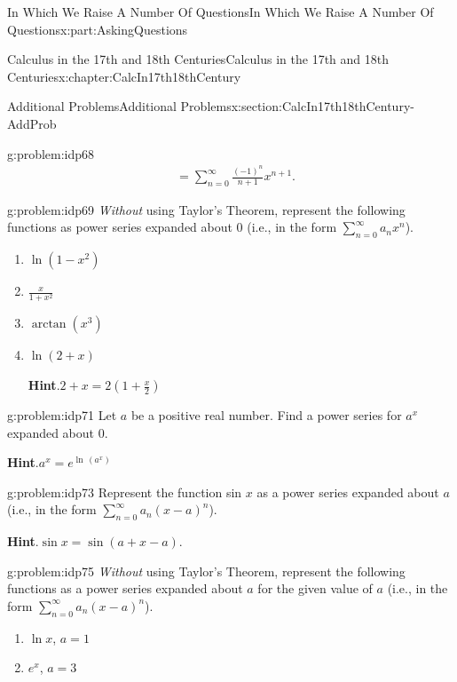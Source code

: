 \documentclass[oneside,10pt,]{book}
\newcommand{\blocktitlefont}{\relax}
\numberwithin{equation}{section}
\newcommand{\amp}{&}
\begin{document}
\begin{partptx}{In Which We Raise A Number Of Questions}{}{In Which We Raise A Number Of Questions}{}{}{x:part:AskingQuestions}
\begin{chapterptx}{Calculus in the 17th and 18th Centuries}{}{Calculus in the 17th and 18th Centuries}{}{}{x:chapter:CalcIn17th18thCentury}
\begin{sectionptx}{Additional Problems}{}{Additional Problems}{}{}{x:section:CalcIn17th18thCentury-AddProb}
\begin{problem}{}{g:problem:idp68}
\begin{align*}
\amp =\sum_{n=0}^\infty\frac{(-1)^n}{n+1}x^{n+1}.{}
\end{align*}
%
\end{problem}
\begin{problem}{}{g:problem:idp69}%
 \emph{Without} using Taylor's Theorem, represent the following functions as power series expanded about 0 (i.e., in the form \(\sum_{n=0}^\infty a_nx^n\)).%
\begin{enumerate}[font=\bfseries,label=(\alph*),ref=\alph*]
\item{}\(\ln\left(1-x^2\right)\)%
\item{}\(\frac{x}{1+x^2}\)%
\item{}\(\arctan \left(x^3\right)\)%
\item{}\(\ln\left(2+x\right)\)%
\par\smallskip%
\noindent\textbf{\blocktitlefont Hint}.\hypertarget{g:hint:idp70}{}\quad{}\(2+x=2\left(1+\frac{x}{2}\right)\)%
\end{enumerate}
\end{problem}
\begin{problem}{}{g:problem:idp71}%
 Let \(a\) be a positive real number. Find a power series for \(a^x\) expanded about 0.%
\par\smallskip%
\noindent\textbf{\blocktitlefont Hint}.\hypertarget{g:hint:idp72}{}\quad{}\(a^x=e^{\ln\,\left(a^x\right)}\)%
\end{problem}
\begin{problem}{}{g:problem:idp73}%
 Represent the function \(\)sin \(x\) as a power series expanded about \(a\) (i.e., in the form \(\sum_{n=0}^\infty a_n\left(x-a\right)^n\)).%
\par\smallskip%
\noindent\textbf{\blocktitlefont Hint}.\hypertarget{g:hint:idp74}{}\quad{}\(\sin x=\sin \left(a+x-a\right)\).%
\end{problem}
\begin{problem}{}{g:problem:idp75}%
 \emph{Without} using Taylor's Theorem, represent the following functions as a power series expanded about \(a\) for the given value of \(a\) (i.e., in the form \(\sum_{n=0}^\infty a_n\left(x-a\right)^n\)).%
\begin{enumerate}[font=\bfseries,label=(\alph*),ref=\alph*]
\item{}\(\ln x\), \(a=1\)%
\item{}\(e^x\), \(a=3\)%

\end{enumerate}
\end{problem}
\end{sectionptx}
\end{chapterptx}
\end{partptx}
\end{document}
